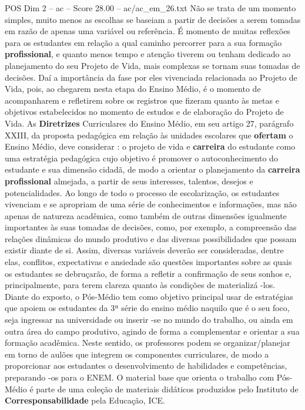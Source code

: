 \begin{textsample}{POS Dim 2 – ac – Score 28.00 – ac/ac\_em\_26.txt}
Não se trata de um momento simples, muito menos as escolhas se baseiam a partir de decisões a serem tomadas em razão de apenas uma variável ou referência.
É momento de muitas reflexões para os estudantes em relação a qual caminho percorrer para a sua formação \textbf{profissional}, e quanto menos tempo e atenção tiverem ou tenham dedicado ao planejamento do seu Projeto de Vida, mais complexas se tornam suas tomadas de decisões.
Daí a importância da fase por eles vivenciada relacionada ao Projeto de Vida, pois, ao chegarem nesta etapa do Ensino Médio, é o momento de acompanharem e refletirem sobre os registros que fizeram quanto às metas e objetivos estabelecidos no momento de estudos e de elaboração do Projeto de Vida.
As \textbf{Diretrizes} Curriculares do Ensino Médio, em seu artigo 27, parágrafo XXIII, da proposta pedagógica em relação às unidades escolares que \textbf{ofertam} o Ensino Médio, deve considerar : o projeto de vida e \textbf{carreira} do estudante como uma estratégia pedagógica cujo objetivo é promover o autoconhecimento do estudante e sua dimensão cidadã, de modo a orientar o planejamento da \textbf{carreira} \textbf{profissional} almejada, a partir de seus interesses, talentos, desejos e potencialidades.
Ao longo de todo o processo de escolarização, os estudantes vivenciam e se apropriam de uma série de conhecimentos e informações, mas não apenas de natureza acadêmica, como também de outras dimensões igualmente importantes às suas tomadas de decisões, como, por exemplo, a compreensão das relações dinâmicas do mundo produtivo e das diversas possibilidades que possam existir diante de si.
Assim, diversas variáveis deverão ser consideradas, dentre elas, conflitos, expectativas e ansiedade são questões importantes sobre as quais os estudantes se debruçarão, de forma a refletir a confirmação de seus sonhos e, principalmente, para terem clareza quanto às condições de materializá -los.
Diante do exposto, o Pós-Médio tem como objetivo principal usar de estratégias que apoiem os estudantes da 3ª série do ensino médio naquilo que é o seu foco, seja ingressar na universidade ou inserir -se no mundo do trabalho, ou ainda em outra área do campo produtivo, agindo de forma a complementar e orientar a sua formação acadêmica.
Neste sentido, os professores podem se organizar/planejar em torno de aulões que integrem os componentes curriculares, de modo a proporcionar aos estudantes o desenvolvimento de habilidades e competências, preparando -os para o ENEM.
O material base que orienta o trabalho com Pós-Médio é parte de uma coleção de materiais didáticos produzidos pelo Instituto de \textbf{Corresponsabilidade} pela Educação, ICE.

\end{textsample}
